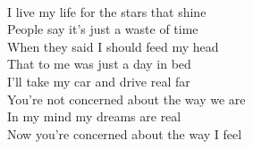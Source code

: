 \\
I live my life for the stars that shine \\
People say it's just a waste of time \\
When they said I should feed my head \\
That to me was just a day in bed \\
I'll take my car and drive real far \\
You're not concerned about the way we are \\
In my mind my dreams are real \\
Now you're concerned about the way I feel \\
